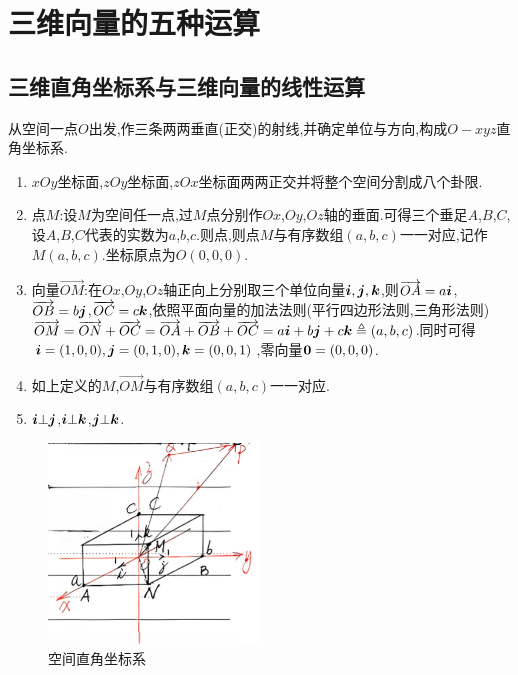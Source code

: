\chapter{三维向量的五种运算}

\section{三维直角坐标系与三维向量的线性运算}

\begin{definition}[空间直角坐标系]
    从空间一点$O$出发,作三条两两垂直(正交)的射线,并确定单位与方向,构成$O-xyz$直角坐标系.
\end{definition}


\begin{proposition}
    \begin{enumerate}
        \item $xOy$坐标面,$zOy$坐标面,$zOx$坐标面两两正交并将整个空间分割成八个卦限.
        \item 点$M$:设$M$为空间任一点,过$M$点分别作$Ox$,$Oy$,$Oz$轴的垂面.可得三个垂足$A$,$B$,$C$,设$A$,$B$,$C$代表的实数为$a$,$b$,$c$.则点,则点$M$与有序数组$(a,b,c)$一一对应,记作$M(a,b,c)$.坐标原点为$O(0,0,0)$.
        \item 向量$\overrightarrow{OM}$:在$Ox$,$Oy$,$Oz$轴正向上分别取三个单位向量$\bm{i},\bm{j},\bm{k}$,则$\overrightarrow{OA}=a\bm{i}$, $\overrightarrow{OB}=b\bm{j}$,$\overrightarrow{OC}=c\bm{k}$,依照平面向量的加法法则(平行四边形法则,三角形法则)$\overrightarrow{OM}=\overrightarrow{ON}+\overrightarrow{OC}=\overrightarrow{OA}+\overrightarrow{OB}+\overrightarrow{OC}=a\bm{i}+b\bm{j}+c\bm{k}\triangleq(a,b,c)$.同时可得$\bm{i}=(1,0,0),\bm{j}=(0,1,0),\bm{k}=(0,0,1)$,零向量$\bm{0}=(0,0,0)$.
        \item 如上定义的$M$,$\overrightarrow{OM}$与有序数组$(a,b,c)$一一对应.
        \item $\bm{i}\bot\bm{j}$,$\bm{i}\bot\bm{k}$,$\bm{j}\bot\bm{k}$.
    \end{enumerate}

\end{proposition}

\begin{figure}[h]
    \centering
    \includegraphics[width=0.5\textwidth]{figure/1-1空间直角坐标系.png}
    \caption{空间直角坐标系}
    \label{fig:fig1}
\end{figure}

